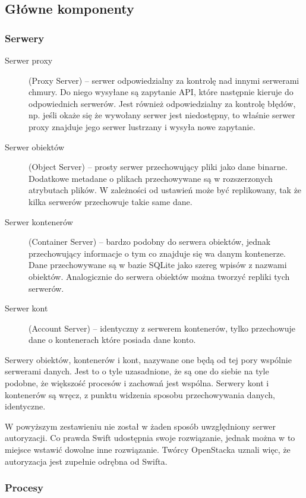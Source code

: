 \subsection{Główne komponenty}\label{sub:glowne komponenty}

\subsubsection{Serwery}\label{sub:serwery}

\begin{description}
\item[Serwer proxy] (Proxy Server) -- serwer odpowiedzialny za kontrolę nad innymi serwerami chmury. Do niego wysyłane są zapytanie API, które następnie kieruje do odpowiednich serwerów. Jest również odpowiedzialny za kontrolę błędów, np. jeśli okaże się że wywołany serwer jest niedostępny, to właśnie serwer proxy znajduje jego serwer lustrzany i wysyła nowe zapytanie.
\item[Serwer obiektów] (Object Server) -- prosty serwer przechowujący pliki jako dane binarne. Dodatkowe metadane o plikach przechowywane są w rozszerzonych atrybutach plików. W zależności od ustawień może być replikowany, tak że kilka serwerów przechowuje takie same dane.
\item[Serwer kontenerów] (Container Server) -- bardzo podobny do serwera obiektów, jednak przechowujący informacje o tym co znajduje się wa danym kontenerze. Dane przechowywane są w bazie SQLite jako szereg wpisów z nazwami obiektów. Analogicznie do serwera obiektów można tworzyć repliki tych serwerów.
\item[Serwer kont] (Account Server) -- identyczny z serwerem kontenerów, tylko przechowuje dane o kontenerach które posiada dane konto.
\end{description}

Serwery obiektów, kontenerów i kont, nazywane one będą od tej pory wspólnie serwerami danych. Jest to o tyle uzasadnione, że są one do siebie na tyle podobne, że większość procesów i zachowań jest wspólna. Serwery kont i kontenerów są wręcz, z punktu widzenia sposobu przechowywania danych, identyczne.

W powyższym zestawieniu nie został w żaden sposób uwzględniony serwer autoryzacji. Co prawda Swift udostępnia swoje rozwiązanie, jednak można w to miejsce wstawić dowolne inne rozwiązanie. Twórcy OpenStacka uznali więc, że autoryzacja jest zupełnie odrębna od Swifta.

\subsubsection{Procesy}\label{sub:procesy}

